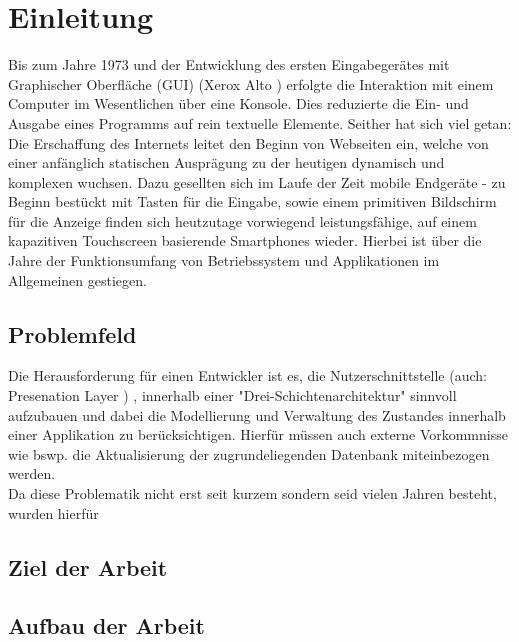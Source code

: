 \section{Einleitung}
\label{sec:einleitung}

Bis zum Jahre 1973 und der Entwicklung des ersten Eingabegerätes mit Graphischer Oberfläche (GUI) (Xerox Alto \cite{xeroxAlto}) erfolgte die Interaktion mit einem Computer im Wesentlichen über eine Konsole. Dies reduzierte die Ein- und Ausgabe eines Programms auf rein textuelle Elemente. Seither hat sich viel getan: Die Erschaffung des Internets leitet den Beginn von Webseiten ein, welche von einer anfänglich statischen Ausprägung zu der heutigen dynamisch und komplexen wuchsen. Dazu gesellten sich im Laufe der Zeit mobile Endgeräte - zu Beginn bestückt mit Tasten für die Eingabe, sowie einem primitiven Bildschirm für die Anzeige finden sich heutzutage vorwiegend leistungsfähige, auf einem kapazitiven Touchscreen basierende Smartphones wieder. Hierbei ist über die Jahre der Funktionsumfang von Betriebssystem und Applikationen im Allgemeinen gestiegen.


\subsection{Problemfeld}
\label{sec:problemfeld}
Die Herausforderung für einen Entwickler ist es, die Nutzerschnittstelle (auch: Presenation Layer \cite{presentationLayerpatternsOfEnterpriseApplicationArchitectureMartinFowler}) ,
innerhalb einer "Drei-Schichtenarchitektur"
\cite{threeTierArchitectureDonaldWolfe2013}
sinnvoll aufzubauen und dabei die Modellierung und Verwaltung des Zustandes innerhalb einer Applikation zu berücksichtigen. Hierfür müssen auch externe Vorkommnisse wie bswp. die Aktualisierung der zugrundeliegenden Datenbank miteinbezogen werden.
\\
Da diese Problematik nicht erst seit kurzem sondern seid vielen Jahren besteht, wurden hierfür 

\subsection{Ziel der Arbeit}
\label{sec:ziel-der-arbeit}

\subsection{Aufbau der Arbeit}
\label{sec:aufbau-der-arbeit}